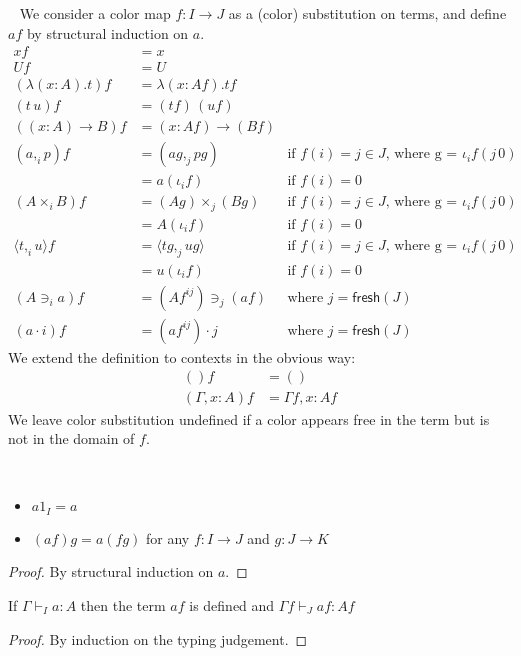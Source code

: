 \documentclass[english]{PaperTools/latex/lipics}
\newcommand\CP[3]{(#2,_{#1} #3)}
\newcommand\CTimes[2]{(#2) ×_{#1}}
\newcommand\op[1]{∋_{#1}}
\newcommand\fp[3]{⟨#2 ,_{#1} #3⟩}
\def\fresh#1{\mathsf{fresh}(#1)}
\begin{document}
\begin{definition}~
  \label{def:color-subst}
  We consider a color map $f : I → J$ as a (color) substitution on terms,
  and define $af$ by structural induction on $a$.
\begin{align*}
  x f & = x \\
  U f & = U \\
  (λ(x:A).t) f &= λ(x:Af).tf \\
  (t\,u) f &= (tf) \, (uf) \\
  ((x:A)→B) f &= (x:Af)→(Bf) \\
  \CP {i} a p f &= \CP {j} {ag} {pg}
    & \text{if $f(i) = j ∈ J$, where g = $ι_i f (j\,0)$} \\
    &= a(ι_if)
    & \text{if $f(i) = 0$} \\
  (A ×_i B) f &= \CTimes {j} {Ag} {(Bg)}
    & \text{if $f(i) = j ∈ J$, where g = $ι_i f (j\,0)$} \\
    &= A(ι_if)
    & \text{if $f(i) = 0$} \\
  \fp {i} t u f &= \fp {j} {tg} {ug}
    & \text{if $f(i) = j ∈ J$, where g = $ι_i f (j\,0)$} \\
    &= u(ι_if)
    & \text{if $f(i) = 0$} \\
  (A \op {i} a) f &= (Af^{ij}) \op {j} (af)
    & \text{where $j = \fresh J$} \\
  (a · i) f &= (af^{ij}) · j
    & \text{where $j = \fresh J$}
  \end{align*}
We extend the definition to contexts in the obvious way:
  \begin{align*}
  () f      &= () \\
  (Γ,x:A) f &= Γ f, x : A f
\end{align*}
We leave color substitution undefined if a color appears free in the
term but is not in the domain of $f$.
\end{definition}

\begin{theorem}~
  \begin{itemize}
  \item $a1_I = a$
  \item $(af)g = a(fg)$ for any $f: I → J$ and $g : J → K$
  \end{itemize}
\end{theorem}
\begin{proof}
  By structural induction on $a$.
\end{proof}

\begin{theorem}
  If $Γ ⊢_I a : A$ then the term
$af$ is defined and $Γ f ⊢_J af : Af$
\end{theorem}
\begin{proof}
  By induction on the typing judgement.
\end{proof}
\end{document}
